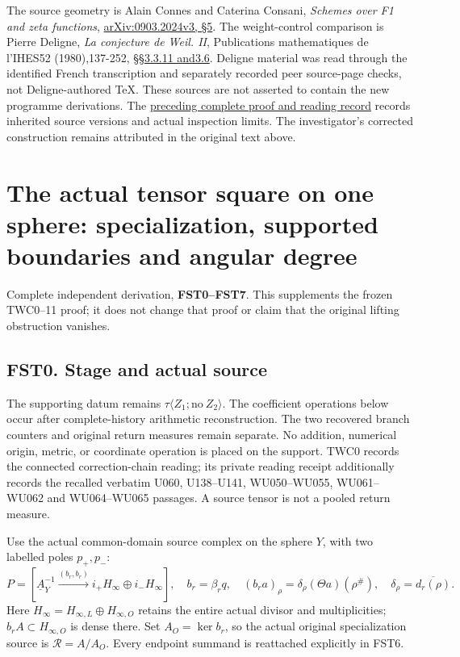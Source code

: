 The source geometry is Alain Connes and Caterina Consani, \emph{Schemes
over F1 and zeta functions},
\href{https://arxiv.org/abs/0903.2024v3}{arXiv:0903.2024v3, §5}. The
weight-control comparison is Pierre Deligne, \emph{La conjecture de
Weil. II}, Publications mathematiques de l'IHES52 (1980),137-252,
\href{https://www.numdam.org/item/PMIHES_1980__52__137_0/}{§§3.3.11
and3.6}. Deligne material was read through the identified French
transcription and separately recorded peer source-page checks, not
Deligne-authored TeX. These sources are not asserted to contain the new
programme derivations. The
\href{https://github.com/KokunoYumeto/zeta-function-research-reader/blob/36a82ecca98addb8a98b48204e349737856c7223/workbenches/splitzero-tandem/continuations/20260924-cohomology-weight-and-character-lifts/BUILD_AND_REVIEW.md}{preceding
complete proof and reading record} records inherited source versions and
actual inspection limits. The investigator's corrected construction
remains attributed in the original text above.

\chapter{The actual tensor square on one sphere: specialization,
supported boundaries and angular
degree}\label{the-actual-tensor-square-on-one-sphere-specialization-supported-boundaries-and-angular-degree}

Complete independent derivation, \textbf{FST0--FST7}. This supplements
the frozen TWC0--11 proof; it does not change that proof or claim that
the original lifting obstruction vanishes.

\section{FST0. Stage and actual
source}\label{fst0.-stage-and-actual-source}

The supporting datum remains
\(\tau\langle Z_1;\mathrm{no}\ Z_2\rangle\). The coefficient operations
below occur after complete-history arithmetic reconstruction. The two
recovered branch counters and original return measures remain separate.
No addition, numerical origin, metric, or coordinate operation is placed
on the support. TWC0 records the connected correction-chain reading; its
private reading receipt additionally records the recalled verbatim U060,
U138--U141, WU050--WU055, WU061--WU062 and WU064--WU065 passages. A
source tensor is not a pooled return measure.

Use the actual common-domain source complex on the sphere \(Y\), with
two labelled poles \(p_+,p_-\): \[
P=[\underline A_Y^{-1}\xrightarrow{(b_r,b_r)}i_+H_\infty\oplus i_-H_\infty],
\quad b_r=\beta_rq,
\quad(b_ra)_\rho=\delta_\rho(\Theta a)(\rho^\#),
\quad\delta_\rho=\overline{d_r(\rho)}.
\tag{FST0.1}
\] Here \(H_\infty=H_{\infty,L}\oplus H_{\infty,O}\) retains the entire
actual divisor and multiplicities; \(b_rA\subset H_{\infty,O}\) is dense
there. Set \(A_O=\ker b_r\), so the actual original specialization
source is \(\mathcal R=A/A_O\). Every endpoint summand is reattached
explicitly in FST6.

